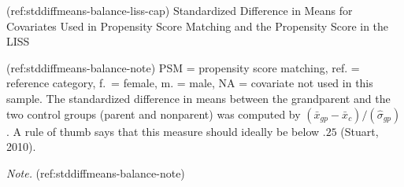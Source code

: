 \begin{appendix}
\begin{table}[ht]
\begin{center}
\begin{threeparttable}
\end{threeparttable}
\end{center}

\end{table}

(ref:stddiffmeans-balance-liss-cap) Standardized Difference in Means for
Covariates Used in Propensity Score Matching and the Propensity Score in
the LISS

(ref:stddiffmeans-balance-note) PSM = propensity score matching, ref. =
reference category, f.~= female, m. = male, NA = covariate not used in
this sample. The standardized difference in means between the
grandparent and the two control groups (parent and nonparent) was
computed by \((\bar{x}_{gp}-\bar{x}_{c})/ (\hat\sigma_{gp})\). A rule of
thumb says that this measure should ideally be below \(.25\) (Stuart,
2010).

\begin{lltable}

\begin{TableNotes}[para]
\normalsize{\textit{Note.} (ref:stddiffmeans-balance-note)}
\end{TableNotes}

\footnotesize{

}
\end{lltable}
\end{appendix}
